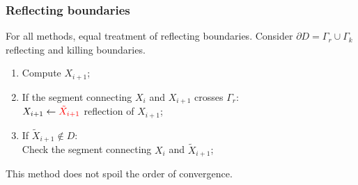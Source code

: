 \begin{frame} %
\frametitle{Reflecting boundaries}
For all methods, equal treatment of reflecting boundaries. Consider $\partial D = \Gamma_r \cup \Gamma_k$ reflecting and killing boundaries.

\vspace{1cm}
\begin{minipage}[0]{0.4\linewidth}
\end{minipage}
\begin{minipage}[0.4]{0.55\linewidth}
\begin{enumerate}
	\item Compute $X_{i+1}$;
	\item If the segment connecting $X_i$ and $X_{i+1}$ crosses $\Gamma_r$: \\
		$X_{i+1} \leftarrow \color{red}\tilde X_{i+1}$ reflection of $X_{i+1}$;
	\item If $\tilde X_{i+1} \notin D$: \\
		Check the segment connecting $X_i$ and $\tilde X_{i+1}$;
\end{enumerate}
\end{minipage}

\vspace{1cm}
This method does not spoil the order of convergence.
\end{frame}



